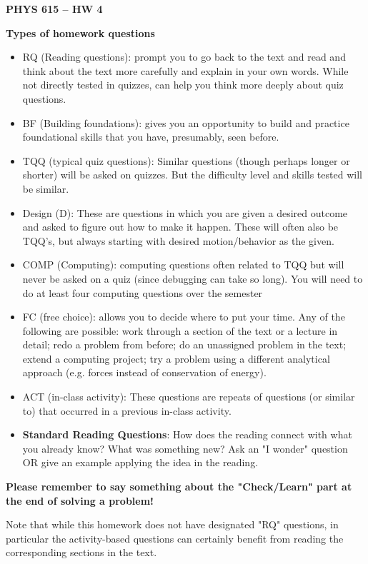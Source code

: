 \documentclass[12pt]{article}
\newcommand{\shortlist}{%
\parindent 0in%
\parskip   0in%
\itemsep   0in%
\topsep    0in%
\parsep    0in%
}
\newcommand{\Title}{PHYS 615 -- HW 4}
\begin{document}
\begin{center}
  {\Large\bfseries\Title}

\end{center}
\bigskip
\bigskip

\textbf{Types of homework questions}
\begin{itemize}\shortlist
  \item	RQ (Reading questions):  prompt you to go back to the text and read and think about the text more carefully and explain in your own words. While not directly tested in quizzes, can help you think more deeply about quiz questions.
  \item	BF (Building foundations):  gives you an opportunity to build and practice foundational skills that you have, presumably, seen before.
  \item	TQQ (typical quiz questions):   Similar questions (though perhaps longer or shorter) will be asked on quizzes.  But the difficulty level and skills tested will be similar.
  \item Design (D):  These are questions in which you are given a desired outcome and asked to figure out how to make it happen.  These will often also be TQQ’s, but always starting with desired motion/behavior as the given.
  \item	COMP (Computing): computing questions often related to TQQ but will never be asked on a quiz (since debugging can take so long).  You will need to do at least four computing questions over the semester
  \item	FC (free choice): allows you to decide where to put your time.  Any of the following are possible:  work through a section of the text or a lecture in detail; redo a problem from before; do an unassigned problem in the text; extend a computing project; try a problem using a different analytical approach (e.g. forces instead of conservation of energy).
  \item ACT (in-class activity): These questions are repeats of questions (or similar to) that occurred in a previous in-class activity.
  \item \textbf{Standard Reading Questions}: How does the reading connect with what you already know? What was something new?  Ask an "I wonder" question OR give an example applying the idea in the reading.
\end{itemize}

\textbf{Please remember to say something about the "Check/Learn" part at the end of solving a problem!}

Note that while this homework does not have designated "RQ" questions, in particular the activity-based questions can certainly benefit from reading the corresponding sections in the text.
\end{document}
